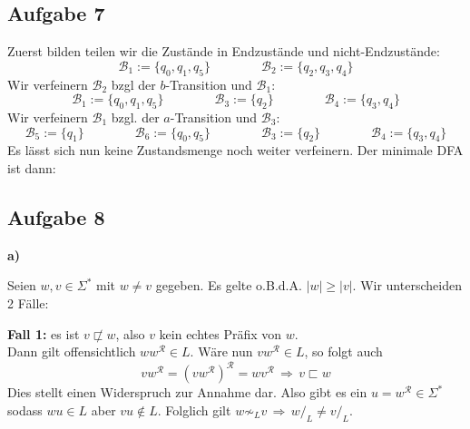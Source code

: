 \documentclass[a4paper,graphics,11pt]{article}
\newcommand{\aufgabe}[1]{\subsection*{Aufgabe #1}}
\begin{document}
\aufgabe{7}
Zuerst bilden teilen wir die Zustände in Endzustände und nicht-Endzustände:
$$
    \mathcal{B}_1 := \{q_0, q_1, q_5\}
    \qquad\qquad
    \mathcal{B}_2 := \{q_2, q_3, q_4\}
$$
Wir verfeinern $\mathcal{B}_2$ bzgl der $b$-Transition und $\mathcal{B}_1$:
$$
    \mathcal{B}_1 := \{q_0, q_1, q_5\}
    \qquad\qquad
    \mathcal{B}_3 := \{q_2\}
    \qquad\qquad
    \mathcal{B}_4 := \{q_3, q_4\}
$$
Wir verfeinern $\mathcal{B}_1$ bzgl. der $a$-Transition und $\mathcal{B}_3$:
$$
    \mathcal{B}_5 := \{q_1\}
    \qquad\qquad
    \mathcal{B}_6 := \{q_0, q_5\}
    \qquad\qquad
    \mathcal{B}_3 := \{q_2\}
    \qquad\qquad
    \mathcal{B}_4 := \{q_3, q_4\}
$$
Es lässt sich nun keine Zustandsmenge noch weiter verfeinern.
Der minimale DFA ist dann:
\begin{center}
\end{center}

\newpage
\aufgabe{8}

\textbf{a)}

Seien $w,v \in \Sigma^*$ mit $w \neq v$ gegeben. Es gelte o.B.d.A. $|w| \geq |v|$. Wir unterscheiden 2 Fälle:

\textbf{Fall 1:} es ist $v \not\sqsubset w$, also $v$ kein echtes Präfix von $w$.\\[5pt]
Dann gilt offensichtlich $ww^\mathcal{R} \in L$. Wäre nun $vw^\mathcal{R} \in L$, so folgt auch
$$
    vw^\mathcal{R} = (vw^\mathcal{R})^\mathcal{R} = wv^\mathcal{R} \,\Longrightarrow\, v \sqsubset w
$$
Dies stellt einen Widerspruch zur Annahme dar. Also gibt es ein $u = w^\mathcal{R} \in \Sigma^*$ sodass
$wu \in L$ aber $vu \notin L$. Folglich gilt $w \not\sim_L v \,\Longrightarrow\, w/_L \neq v/_L$.
\end{document}
